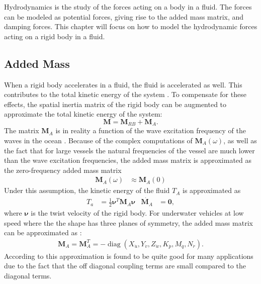 Hydrodynamics is the study of the forces acting on a body in a fluid. The forces
can be modeled as potential forces, giving rise to the added mass matrix, and
damping forces. This chapter will focus on how to model the hydrodynamic forces
acting on a rigid body in a fluid.

\subsection{Added Mass}

When a rigid body accelerates in a fluid, the fluid is accelerated as well. 
This contributes to the total kinetic energy of the system \cite{antonelli2018}.
To compensate for these effects, the spatial inertia matrix of the rigid body
can be augmented to approximate the total kinetic energy of the system: 
\begin{equation}
    \bm{M} = \bm{M}_{RB} + \bm{M}_{A}.
\end{equation}
The matrix $\bm{M}_A$ is in reality a function of the wave excitation frequency
of the waves in the ocean \cite{fossen2021}. Because of the complex computations
of $\bm{M}_A(\omega)$, as well as the fact that for large vessels the natural
frequencies of the vessel are much lower than the wave excitation frequencies,
the added mass matrix is approximated as the zero-frequency added mass matrix
\begin{align}
    \bm{M}_A(\omega) &\approx \bm{M}_A(0)
\end{align}
Under this assumption, the kinetic energy of the fluid $T_A$ is approximated
as
\begin{align}
    T_a &= \frac{1}{2}\bm{\nu}^T\bm{M}_A\bm{\nu} & \dot{\bm{M}_A} &= \bm{0},
\end{align}
where $\bm{\nu}$ is the twist velocity of the rigid body. For underwater 
vehicles at low speed where the the shape has three planes of symmetry, the
added mass matrix can be approximated as \cite{fossen2021}:
\begin{align}
    \bm{M}_A = \bm{M}_A^T =
    -\operatorname{diag}(X_{\dot{u}}, Y_{\dot{v}}, Z_{\dot{w}},
        K_{\dot{p}}, M_{\dot{q}}, N_{\dot{r}}).
\end{align}
According to \cite{fossen2021} this approximation is found to be quite good for
many applications due to the fact that the off diagonal coupling terms are small
compared to the diagonal terms.

